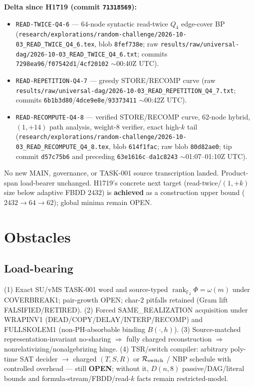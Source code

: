 \documentclass[11pt]{article}
\begin{document}
\textbf{Delta since H1719 (commit \texttt{71318569}):}
\begin{itemize}
\item \texttt{READ-TWICE-Q4-6} --- $64$-node syntactic read-twice $Q_4$ edge-cover BP
  (\texttt{research/explorations/random-challenge/2026-10-03\_READ\_TWICE\_Q4\_6.tex},
  blob \texttt{8fef738e}; raw \texttt{results/raw/universal-dag/2026-10-03\_READ\_TWICE\_Q4\_6.txt};
  commits \texttt{7298ea96}/\texttt{f07542d1}/\texttt{4cf20102} $\sim$00:40Z UTC).
\item \texttt{READ-REPETITION-Q4-7} --- greedy STORE/RECOMP curve
  (raw \texttt{results/raw/universal-dag/2026-10-03\_READ\_REPETITION\_Q4\_7.txt};
  commits \texttt{6b1b3d80}/\texttt{4dce9e8e}/\texttt{93373411} $\sim$00:42Z UTC).
\item \texttt{READ-RECOMPUTE-Q4-8} --- verified STORE/RECOMP curve, $62$-node hybrid,
  $(1,+14)$ path analysis, weight-$8$ verifier, exact high-$k$ tail
  (\texttt{research/explorations/random-challenge/2026-10-03\_READ\_RECOMPUTE\_Q4\_8.tex},
  blob \texttt{614f1fac}; raw blob \texttt{80d82ae0}; tip commit \texttt{d57c75b6}
  and preceding \texttt{63e1616c}--\texttt{da1c8243} $\sim$01:07--01:10Z UTC).
\end{itemize}
No new MAIN, governance, or TASK-001 source transcription landed. Product-span load-bearer unchanged.
H1719's concrete next target (read-twice/$(1,+k)$ size below adaptive FBDD $2432$) is
\textbf{achieved} as a construction upper bound ($2432\to64\to62$); global minima remain OPEN.

\section*{Obstacles}
\subsection*{Load-bearing}
(1) Exact SU/vMS TASK-001 word and source-typed
$\operatorname{rank}_{\mathbb F_2}\Phi=\omega(m)$ under COVERBREAK1; pair-growth OPEN;
char-$2$ pitfalls retained (Gram lift FALSIFIED/RETIRED).
(2) Forced SAME\_REALIZATION acquisition under WRAPINV1
(DEAD/COPY/DELAY/INTERP/RECOMP) and FULLSKOLEM1 (non-PH-absorbable binding $B(\cdot,h)$).
(3) Source-matched representation-invariant no-sharing $\Rightarrow$ fully charged reconstruction
$\Rightarrow$ nonrelativizing/nonalgebrizing hinge.
(4) TSR/switch compiler: arbitrary poly-time SAT decider $\to$ charged $(T,S,R)$ or
$\mathcal R_{\rm switch}$ / NBP schedule with controlled overhead --- still \textbf{OPEN};
without it, $D(n,8)$ passive/DAG/literal bounds and formula-stream/FBDD/read-$k$ facts remain
restricted-model.
\end{document}
